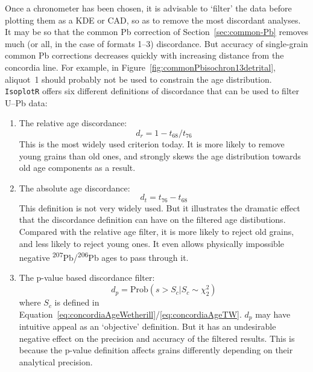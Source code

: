 \begin{refsection}
Once a chronometer has been chosen, it is advisable to `filter' the
data before plotting them as a KDE or CAD, so as to remove the most
discordant analyses. It may be so that the common Pb correction of
Section~\ref{sec:common-Pb} removes much (or all, in the case of
formats 1--3) discordance. But accuracy of single-grain common Pb
corrections decreases quickly with increasing distance from the
concordia line. For example, in
Figure~\ref{fig:commonPbisochron13detrital}, aliquot~1 should probably
not be used to constrain the age distribution. \texttt{IsoplotR}
offers six different definitions of discordance that can be used to
filter U--Pb data:

\begin{enumerate}
  \item The relative age discordance:
    \begin{equation}
      d_{r} = 1 - t_{68}/t_{76}
      \label{eq:dr}
    \end{equation}
    This is the most widely used criterion today.  It is more likely
    to remove young grains than old ones, and strongly skews the age
    distribution towards old age components as a result.
  \item The absolute age discordance:
    \begin{equation}
      d_{t} = t_{76} - t_{68}
      \label{eq:dt}
    \end{equation}
    This definition is not very widely used. But it illustrates the
    dramatic effect that the discordance definition can have on the
    filtered age distibutions. Compared with the relative age filter,
    it is more likely to reject old grains, and less likely to reject
    young ones. It even allows physically impossible negative
    \textsuperscript{207}Pb/\textsuperscript{206}Pb ages to pass
    through it.
  \item The p-value based discordance filter:
    \begin{equation}
      d_p = \mbox{Prob}\left(s > S_c | S_c \sim \chi^2_2\right)
      \label{eq:dp}
    \end{equation}
    \noindent where $S_c$ is defined in
    Equation~\ref{eq:concordiaAgeWetherill}/\ref{eq:concordiaAgeTW}.
    $d_p$ may have intuitive appeal as an `objective' definition. But
    it has an undesirable negative effect on the precision and
    accuracy of the filtered results.  This is because the p-value
    definition affects grains differently depending on their
    analytical precision.\\


\end{enumerate}
\end{refsection}
